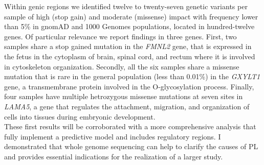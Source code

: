 \noindent
Within genic regions we identified twelve to twenty-seven genetic variants per sample of high (stop gain) and moderate (missense) impact with frequency lower than 5\% in gnomAD and 1000 Genomes populations, located in hundred-twelve genes. Of particular relevance we report findings in three genes. First, two samples share a stop gained mutation in the \textit{FMNL2} gene, that is expressed in the fetus in the cytoplasm of brain, spinal cord, and rectum
where it is involved in cytoskeleton organization. Secondly, all the six samples share a missense mutation that is rare in the general population (less than 0.01\%) in the \textit{GXYLT1} gene, a transmembrane protein involved in the O-glycosylation process. Finally, four samples have multiple hetrozygous missense mutations at seven sites in \textit{LAMA5}, a gene that regulates the attachment, migration, and organization of cells into tissues during embryonic development.\\

\noindent
These first results will be corroborated with a more comprehensive analysis that fully implement a predictive model and includes regulatory regions. I demonstrated that whole genome sequencing can help to clarify the causes of PL and provides essential indications for the realization of a larger study.

